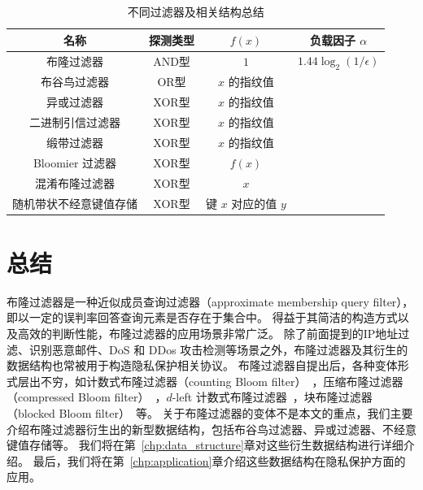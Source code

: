 \begin{table}[ht]
  \centering
  \caption{不同过滤器及相关结构总结}
  \label{tab:construct}
  \begin{tabular}{cccc}
    \toprule
    名称  &  探测类型  &  $f(x)$  & 负载因子 $\alpha$ \\
    \midrule
    布隆过滤器  &  AND型  &  $1$ & $1.44\log_2(1/\epsilon)$  \\
    布谷鸟过滤器  &  OR型  &  $x$ 的指纹值 &   \\
    异或过滤器  &  XOR型  &  $x$ 的指纹值 &  \\
    二进制引信过滤器  & XOR型  &  $x$ 的指纹值 &  \\
    缎带过滤器 & XOR型 & $x$ 的指纹值 &  \\
    Bloomier 过滤器  &  XOR型  &  $f(x)$ & \\
    混淆布隆过滤器  &  XOR型  &  $x$ & \\
    随机带状不经意键值存储 &  XOR型  &  键 $x$ 对应的值 $y$ & \\
    \bottomrule
  \end{tabular}
\end{table}

\section{总结}

布隆过滤器是一种近似成员查询过滤器（approximate membership query filter），即以一定的误判率回答查询元素是否存在于集合中。
得益于其简洁的构造方式以及高效的判断性能，布隆过滤器的应用场景非常广泛。
除了前面提到的IP地址过滤、识别恶意邮件、DoS 和 DDos 攻击检测等场景之外，布隆过滤器及其衍生的数据结构也常被用于构造隐私保护相关协议。
布隆过滤器自提出后，各种变体形式层出不穷，如计数式布隆过滤器（counting Bloom filter）~\cite{lifan2000summary}，压缩布隆过滤器（compressed Bloom filter）~\cite{mitzenmacher2002compressed}，$d$-left 计数式布隆过滤器~\cite{bonomi2006improved}，块布隆过滤器（blocked Bloom filter）~\cite{putze2009cache}等。
关于布隆过滤器的变体不是本文的重点，我们主要介绍布隆过滤器衍生出的新型数据结构，包括布谷鸟过滤器、异或过滤器、不经意键值存储等。
我们将在第~\ref{chp:data_structure}章对这些衍生数据结构进行详细介绍。
最后，我们将在第~\ref{chp:application}章介绍这些数据结构在隐私保护方面的应用。